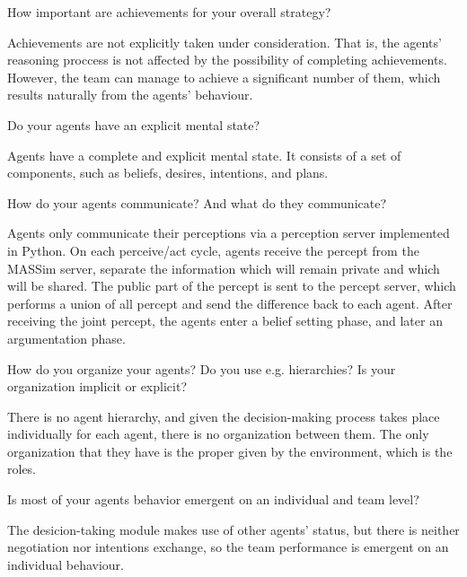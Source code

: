 \begin{question}
How important are achievements for your overall strategy?  
\end{question}

Achievements are not explicitly taken under consideration. That is, the agents'
reasoning proccess is not affected by the possibility of completing
achievements.    However, the team can manage to achieve a significant number of
them, which results naturally from the agents' behaviour. 

\begin{question}
Do your agents have an explicit mental state?
\end{question}

Agents have a complete and explicit mental state. It consists of a set of
components, such as beliefs, desires, intentions, and plans. 

\begin{question}
How do your agents communicate? And what do they communicate?  
\end{question}

Agents only communicate their perceptions via a perception server implemented in
Python.  On each perceive/act cycle, agents receive the percept from the MASSim
server, separate the information which will remain private and which will be
shared.  The public part of the percept is sent to the percept server, which
performs a union of all percept and send the difference back to each agent.
After receiving the joint percept, the agents enter a belief setting phase, and
later an argumentation phase.

\begin{question}
How do you organize your agents? Do you use e.g. hierarchies? Is your
organization implicit or explicit?
\end{question}

There is no agent hierarchy, and given the decision-making process takes place
individually for each agent, there is no organization between them.  The only
organization that they have is the proper given by the environment, which is the
roles.

\begin{question}
Is most of your agents behavior emergent on an individual and team level?
\end{question}

The desicion-taking module makes use of other agents' status, but there is
neither negotiation nor intentions exchange, so the team performance is emergent
on an individual behaviour.

